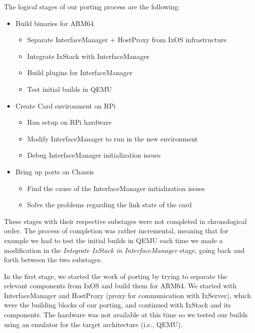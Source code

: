 The logical stages of our porting process are the following:
\begin{itemize}
    \item Build binaries for ARM64
    \begin{itemize}
        \item Separate InterfaceManager + HostProxy from IxOS infrastructure
        \item Integrate IxStack with InterfaceManager
        \item Build plugins for InterfaceManager
        \item Test initial builds in QEMU
    \end{itemize}
    \item Create Card environment on RPi
    \begin{itemize}
        \item Run setup on RPi hardware
        \item Modify InterfaceManager to run in the new environment
        \item Debug InterfaceManager initialization issues
    \end{itemize}
    \item Bring up ports on Chassis
    \begin{itemize}
        \item Find the cause of the InterfaceManager initialization issues
        \item Solve the problems regarding the link state of the card
    \end{itemize}
\end{itemize}
These stages with their respective substages were not completed in chronological
order. The process of completion was rather incremental, meaning that for
example we had to test the initial builds in QEMU each time we made a
modification in the \textit{Integrate IxStack in InterfaceManager} stage, going back and forth
between the two substages.

In the first stage, we started the work of porting by trying to separate the
relevant components from IxOS and build them for ARM64. We started with
InterfaceManager and HostProxy (proxy for communication with IxServer), which
were the building blocks of our porting, and continued with IxStack and its
components. The hardware was not available at this time so we tested our builds
using an emulator for the target architecture (i.e., QEMU).

